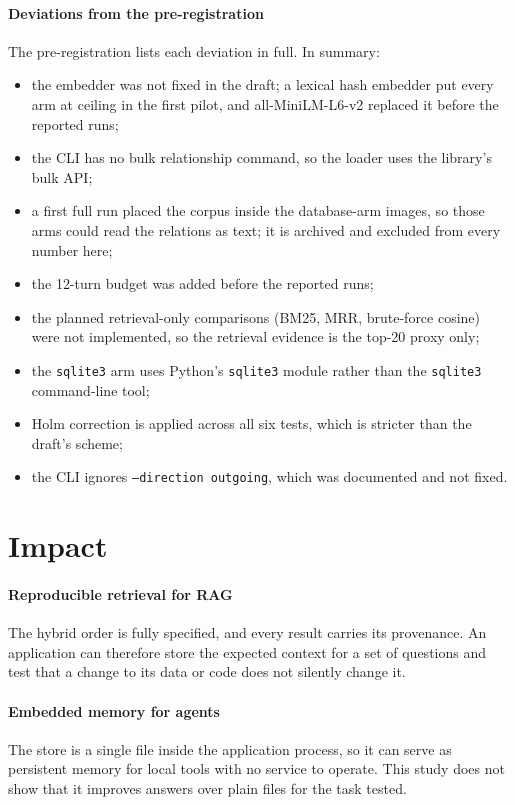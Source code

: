 \documentclass[preprint,12pt,a4paper]{elsarticle}
\newcommand{\code}[1]{\texttt{#1}}
\begin{document}
\paragraph{Deviations from the pre-registration} The pre-registration lists each deviation in full. In summary:
\begin{itemize}
  \item the embedder was not fixed in the draft; a lexical hash embedder put every arm at ceiling in the first pilot, and all-MiniLM-L6-v2 replaced it before the reported runs;
  \item the CLI has no bulk relationship command, so the loader uses the library's bulk API;
  \item a first full run placed the corpus inside the database-arm images, so those arms could read the relations as text; it is archived and excluded from every number here;
  \item the 12-turn budget was added before the reported runs;
  \item the planned retrieval-only comparisons (BM25, MRR, brute-force cosine) were not implemented, so the retrieval evidence is the top-20 proxy only;
  \item the \code{sqlite3} arm uses Python's \code{sqlite3} module rather than the \code{sqlite3} command-line tool;
  \item Holm correction is applied across all six tests, which is stricter than the draft's scheme;
  \item the CLI ignores \code{--direction outgoing}, which was documented and not fixed.
\end{itemize}

\section{Impact}
\label{sec:impact}

\paragraph{Reproducible retrieval for RAG} The hybrid order is fully specified, and every result carries its provenance. An application can therefore store the expected context for a set of questions and test that a change to its data or code does not silently change it.

\paragraph{Embedded memory for agents} The store is a single file inside the application process, so it can serve as persistent memory for local tools with no service to operate. This study does not show that it improves answers over plain files for the task tested.
\end{document}
